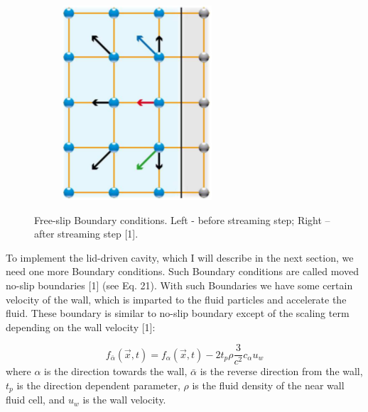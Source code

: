 \begin{figure}[H]
\begin{subfigure}[h]{0.3\textwidth}
    \includegraphics[width=\textwidth]{img/fig9-2.png}
  \end{subfigure}
  \caption{Free-slip Boundary conditions. Left - before streaming step; Right – after streaming step [1].}
\end{figure}

To implement the lid-driven cavity, which I will describe in the next section, we need one more Boundary conditions. Such Boundary conditions are called moved no-slip boundaries [1] (see Eq. 21). With such Boundaries we have some certain velocity of the wall, which is imparted to the fluid particles and accelerate the fluid. These boundary is similar to no-slip boundary except of the scaling term depending on the wall velocity [1]:

\begin{equation}
f_{\bar{\alpha}}(\vec{x},t) = f_{\alpha}(\vec{x},t) - 2 t_p \rho \frac{3}{c^2} c_{\alpha} u_{w}
\end{equation}
where $\alpha$ is the direction towards the wall, $\bar{\alpha}$ is the reverse direction from the wall, $t_p$ is the direction dependent parameter, $\rho$ is the fluid density of the near wall fluid cell, and $u_w$ is the wall velocity.
